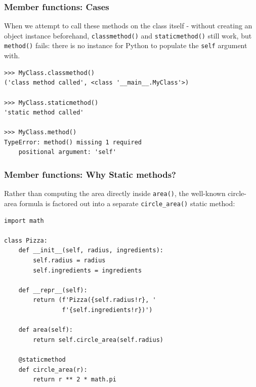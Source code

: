 \begin{frame}[fragile]\frametitle{Member functions: Cases}
When we attempt to call these methods on the class itself - without creating an object instance
beforehand, \texttt{classmethod()} and \texttt{staticmethod()} still work, but \texttt{method()}
fails: there is no instance for Python to populate the \texttt{self} argument with.
\begin{lstlisting}
>>> MyClass.classmethod()
('class method called', <class '__main__.MyClass'>)

>>> MyClass.staticmethod()
'static method called'

>>> MyClass.method()
TypeError: method() missing 1 required
    positional argument: 'self'
\end{lstlisting}

\end{frame}

\begin{frame}[fragile]\frametitle{Member functions: Why Static methods?}

Rather than computing the area directly inside \lstinline|area()|, the well-known circle-area
formula is factored out into a separate \lstinline|circle_area()| static method:
\begin{lstlisting}
import math

class Pizza:
    def __init__(self, radius, ingredients):
        self.radius = radius
        self.ingredients = ingredients

    def __repr__(self):
        return (f'Pizza({self.radius!r}, '
                f'{self.ingredients!r})')

    def area(self):
        return self.circle_area(self.radius)

    @staticmethod
    def circle_area(r):
        return r ** 2 * math.pi
\end{lstlisting}

\end{frame}



